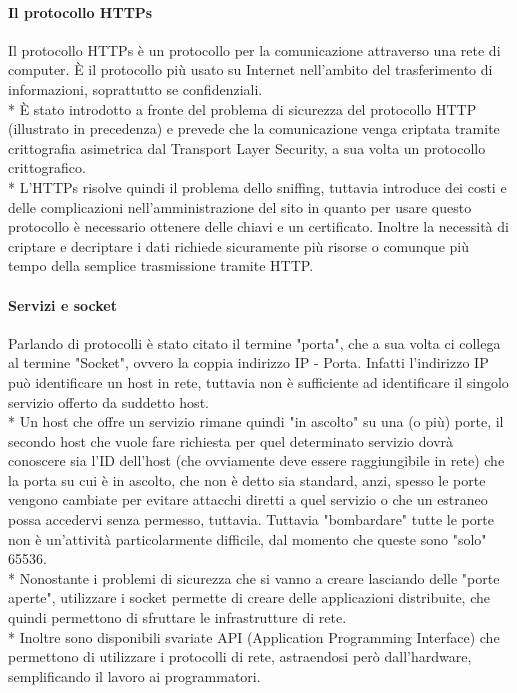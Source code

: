 \documentclass[12pt]{article}
\begin{document}
\bigskip
\paragraph{Il protocollo HTTPs}
Il protocollo HTTPs è un protocollo per la comunicazione attraverso una rete di computer. È il protocollo più usato su Internet nell'ambito del trasferimento di informazioni, soprattutto se confidenziali.\\*
È stato introdotto a fronte del problema di sicurezza del protocollo HTTP (illustrato in precedenza) e prevede che la comunicazione venga criptata tramite crittografia asimetrica dal Transport Layer Security, a sua volta un protocollo crittografico.\\*
L'HTTPs risolve quindi il problema dello sniffing, tuttavia introduce dei costi e delle complicazioni nell'amministrazione del sito in quanto per usare questo protocollo è necessario ottenere delle chiavi e un certificato. Inoltre la necessità di criptare e decriptare i dati richiede sicuramente più risorse o comunque più tempo della semplice trasmissione tramite HTTP.

\bigskip
\paragraph{Servizi e socket}
Parlando di protocolli è stato citato il termine "porta", che a sua volta ci collega al termine "Socket", ovvero la coppia indirizzo IP - Porta. Infatti l'indirizzo IP può identificare un host in rete, tuttavia non è sufficiente ad identificare il singolo servizio offerto da suddetto host.\\*
Un host che offre un servizio rimane quindi "in ascolto" su una (o più) porte, il secondo host che vuole fare richiesta per quel determinato servizio dovrà conoscere sia l'ID dell'host (che ovviamente deve essere raggiungibile in rete) che la porta su cui è in ascolto, che non è detto sia standard, anzi, spesso le porte vengono cambiate per evitare attacchi diretti a quel servizio o che un estraneo possa accedervi senza permesso, tuttavia. Tuttavia "bombardare" tutte le porte non è un'attività particolarmente difficile, dal momento che queste sono "solo" 65536.\\* Nonostante i problemi di sicurezza che si vanno a creare lasciando delle "porte aperte", utilizzare i socket permette di creare delle applicazioni distribuite, che quindi permettono di sfruttare le infrastrutture di rete.\\*
Inoltre sono disponibili svariate API (Application Programming Interface) che permettono di utilizzare i protocolli di rete, astraendosi però dall'hardware, semplificando il lavoro ai programmatori.
\end{document}
